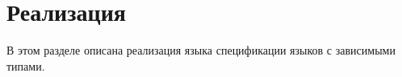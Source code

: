 \section{Реализация} \label{impl_section}
В этом разделе описана реализация языка спецификации языков с зависимыми типами.












